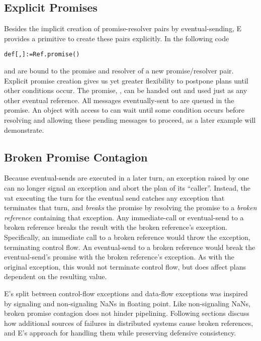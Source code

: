\documentclass{llncs}
\begin{document}
\subsection{Explicit Promises}

Besides the implicit creation of promise-resolver pairs by
eventual-sending, E provides a primitive to create these pairs
explicitly. In the following code
%
\begin{alltt}
    def [, ] := Ref.promise()
\end{alltt}
%
 and  are bound to the promise and resolver of a new
promise/resolver pair. Explicit promise creation gives us yet greater
flexibility to postpone plans until other conditions occur. The
promise, , can be handed out and used just as any other
eventual reference. All messages eventually-sent to  are queued
in the promise. An object with access to  can wait until some
condition occurs before resolving  and allowing these pending
messages to proceed, as a later example will demonstrate.

\subsection{Broken Promise Contagion}

Because eventual-sends are executed in a later turn, an exception
raised by one can no longer signal an exception and abort the plan of
its ``caller''. Instead, the vat executing the turn for the eventual
send catches any exception that terminates that turn, and
\emph{breaks} the promise by resolving the promise to a \emph{broken
reference} containing that exception.  Any immediate-call or
eventual-send to a broken reference breaks the result with the broken
reference's exception.  Specifically, an immediate call to a broken
reference would throw the exception, terminating control flow.  An
eventual-send to a broken reference would break the eventual-send's
promise with the broken reference's exception. As with the original
exception, this would not terminate control flow, but does affect
plans dependent on the resulting value.

E's split between control-flow exceptions and data-flow exceptions was
inspired by signaling and non-signaling NaNs in floating point. Like
non-signaling NaNs, broken promise contagion does not hinder
pipelining. Following sections discuss how additional sources of
failures in distributed systems cause broken references, and E's
approach for handling them while preserving defensive consistency.
\end{document}
